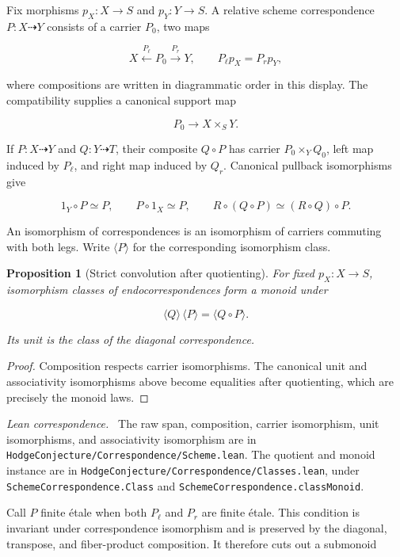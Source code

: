 \documentclass[11pt]{article}
\newtheorem{proposition}[theorem]{Proposition}
\theoremstyle{definition}
\theoremstyle{remark}
\newcommand{\leanpath}[1]{\texttt{\nolinkurl{#1}}}
\newcommand{\corrsrc}[1]{%
  \leanpath{HodgeConjecture/Correspondence/#1}}
\newenvironment{leanfiles}
  {\par\medskip\begingroup\footnotesize\raggedright\noindent
   \textit{Lean correspondence.}\ }
  {\par\endgroup\medskip}
\begin{document}
Fix morphisms \(p_X:X\to S\) and \(p_Y:Y\to S\).  A relative scheme
correspondence \(P:X\dashrightarrow Y\) consists of a carrier \(P_0\), two
maps

\[
  X\xleftarrow{\,P_\ell\,}P_0
   \xrightarrow{\,P_r\,}Y,
  \qquad
  P_\ell p_X=P_r p_Y,
\]

where compositions are written in diagrammatic order in this display.  The
compatibility supplies a canonical support map

\[
  P_0\longrightarrow X\times_S Y.
\]

If \(P:X\dashrightarrow Y\) and \(Q:Y\dashrightarrow T\), their composite
\(Q\circ P\) has carrier \(P_0\times_YQ_0\), left map induced by \(P_\ell\),
and right map induced by \(Q_r\).  Canonical pullback isomorphisms give

\[
  1_Y\circ P\simeq P,
  \qquad
  P\circ1_X\simeq P,
  \qquad
  R\circ(Q\circ P)\simeq(R\circ Q)\circ P.
\]

An isomorphism of correspondences is an isomorphism of carriers commuting
with both legs.  Write \(\langle P\rangle\) for the corresponding isomorphism
class.

\begin{proposition}[Strict convolution after quotienting]
\label{prop:class-monoid}
For fixed \(p_X:X\to S\), isomorphism classes of endocorrespondences form a
monoid under

\[
  \langle Q\rangle\,\langle P\rangle
  =\langle Q\circ P\rangle.
\]

Its unit is the class of the diagonal correspondence.
\end{proposition}

\begin{proof}
Composition respects carrier isomorphisms.  The canonical unit and
associativity isomorphisms above become equalities after quotienting, which
are precisely the monoid laws.
\end{proof}

\begin{leanfiles}
The raw span, composition, carrier isomorphism, unit isomorphisms, and
associativity isomorphism are in \corrsrc{Scheme.lean}.  The quotient and
monoid instance are in \corrsrc{Classes.lean}, under
\leanpath{SchemeCorrespondence.Class} and
\leanpath{SchemeCorrespondence.classMonoid}.
\end{leanfiles}

Call \(P\) finite \'etale when both \(P_\ell\) and \(P_r\) are finite
\'etale.  This condition is invariant under correspondence isomorphism and
is preserved by the diagonal, transpose, and fiber-product composition.  It
therefore cuts out a submonoid
\end{document}
